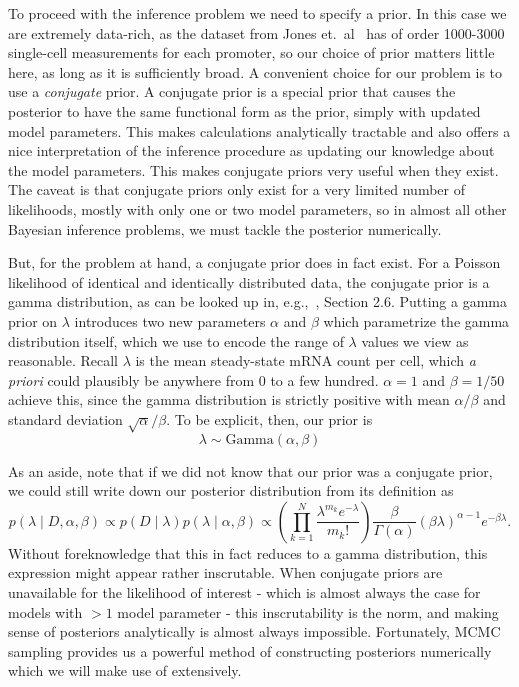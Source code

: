 To proceed with the inference problem we need to specify a prior. In this case
we are extremely data-rich, as the dataset from Jones et.\ al~\cite{Jones2014}
has of order 1000-3000 single-cell measurements for each promoter, so our choice
of prior matters little here, as long as it is sufficiently broad. A convenient
choice for our problem is to use a \textit{conjugate} prior. A conjugate prior
is a special prior that causes the posterior to have the same functional form as
the prior, simply with updated model parameters. This makes calculations
analytically tractable and also offers a nice interpretation of the inference
procedure as updating our knowledge about the model parameters. This makes
conjugate priors very useful when they exist. The caveat is that conjugate
priors only exist for a very limited number of likelihoods, mostly with only one
or two model parameters, so in almost all other Bayesian inference problems, we
must tackle the posterior numerically.

But, for the problem at hand, a conjugate prior does in fact exist. For a
Poisson likelihood of identical and identically distributed data, the conjugate
prior is a gamma distribution, as can be looked up in, e.g.,~\cite{Gelman2013},
Section 2.6. Putting a gamma prior on $\lambda$ introduces two new parameters
$\alpha$ and $\beta$ which parametrize the gamma distribution itself, which we
use to encode the range of $\lambda$ values we view as reasonable. Recall
$\lambda$ is the mean steady-state mRNA count per cell, which \textit{a priori}
could plausibly be anywhere from 0 to a few hundred. $\alpha=1$ and $\beta=1/50$
achieve this, since the gamma distribution is strictly positive with mean
$\alpha/\beta$ and standard deviation $\sqrt{\alpha}/\beta$. To be explicit,
then, our prior is
\begin{equation}
\lambda \sim \text{Gamma}(\alpha, \beta)
\end{equation}

As an aside, note that if we did not know that our prior was a conjugate prior,
we could still write down our posterior distribution from its definition as
\begin{equation}
p(\lambda\mid D,\alpha,\beta)
\propto p(D\mid\lambda) p(\lambda \mid\alpha,\beta)
\propto \left(\prod_{k=1}^N \frac{\lambda^{m_k}e^{-\lambda}}{m_k!}\right)
        \frac{\beta}{\Gamma(\alpha)}(\beta\lambda)^{\alpha-1} e^{-\beta\lambda}
.
\end{equation}
Without foreknowledge that this in fact reduces to a gamma distribution, this
expression might appear rather inscrutable. When conjugate priors are
unavailable for the likelihood of interest - which is almost always the case for
models with $>1$ model parameter - this inscrutability is the norm, and making
sense of posteriors analytically is almost always impossible. Fortunately, MCMC
sampling provides us a powerful method of constructing posteriors numerically
which we will make use of extensively.

